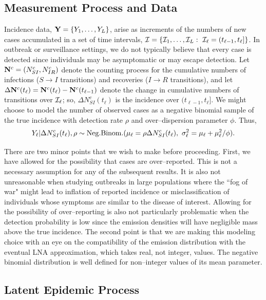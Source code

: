 \subsection{Measurement Process and Data}
\label{subsec:lna_measproc}
Incidence data, $ \mathbf{Y} = \lbrace Y_1,\dots,Y_L\rbrace $,  arise as increments of the numbers of new cases accumulated in a set of time intervals, $ \mathcal{I} = \lbrace\mathcal{I}_1,\dots,\mathcal{I}_L:\ \mathcal{I}_\ell = (t_{\ell-1},t_\ell]\rbrace $. In outbreak or surveillance settings, we do not typically believe that every case is detected since individuals may be asymptomatic or may escape detection. Let $ \mathbf{N}^c = (N^c_{SI}, N^c_{IR}) $ denote the counting process for the cumulative numbers of infections ($ S\rightarrow I $ transitions) and recoveries ($ I\rightarrow R $ transitions), and let $ \Delta \mathbf{N}^c(t_\ell) = \mathbf{N}^c(t_\ell) - \mathbf{N}^c(t_{\ell-1})$ denote the change in cumulative numbers of transitions over $ \mathcal{I}_\ell $; so, $ \Delta N^c_{SI}(t_\ell)$ is the incidence over $ (t_{\ell-1},t_\ell] $. We might choose to model the number of observed cases as a negative binomial sample of the true incidence with detection rate $ \rho $ and over--dispersion parameter $ \phi $. Thus,
\begin{equation}
\label{eqn:incidence_emitprob}
Y_\ell|\Delta N^c_{SI}(t_\ell),\rho \sim \mathrm{Neg.Binom.}(\mu_\ell = \rho\Delta N^c_{SI}(t_\ell),\ \sigma^2_\ell = \mu_\ell + \mu_\ell^2/\phi).
\end{equation}

There are two minor points that we wish to make before proceeding. First, we have allowed for the possibility that cases are over--reported. This is not a necessary assumption for any of the subsequent results. It is also not unreasonable when studying outbreaks in large populations where the ``fog of war" might lead to inflation of reported incidence or misclassification of individuals whose symptoms are similar to the disease of interest. Allowing for the possibility of over--reporting is also not particularly problematic when the detection probability is low since the emission densities will have negligible mass above the true incidence. The second point is that we are making this modeling choice with an eye on the compatibility of the emission distribution with the eventual LNA approximation, which takes real, not integer, values. The negative binomial distribution is well defined for non--integer values of its mean parameter. 

\subsection{Latent Epidemic Process}
\label{subsec:lna_epid_proc}

